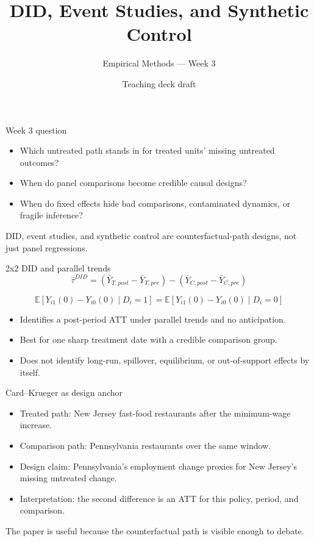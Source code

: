 \documentclass[aspectratio=169,11pt]{beamer}
\title{DID, Event Studies, and Synthetic Control}
\subtitle{Empirical Methods --- Week 3}
\author{Teaching deck draft}
\date{}
\newcommand{\E}{\mathbb{E}}
\newcommand{\1}{\mathbf{1}}
\begin{document}
\begin{frame}
  \titlepage
\end{frame}

\begin{frame}{Week 3 question}
\begin{itemize}
    \item Which untreated path stands in for treated units' missing untreated outcomes?
    \item When do panel comparisons become credible causal designs?
    \item When do fixed effects hide bad comparisons, contaminated dynamics, or fragile inference?
\end{itemize}

\medskip
DID, event studies, and synthetic control are counterfactual-path designs, not just panel regressions.
\end{frame}

\begin{frame}{2x2 DID and parallel trends}
\[
\widehat{\tau}^{DID}
=
\left(\bar{Y}_{T,post}-\bar{Y}_{T,pre}\right)
-
\left(\bar{Y}_{C,post}-\bar{Y}_{C,pre}\right)
\]

\[
\E[Y_{i1}(0)-Y_{i0}(0)\mid D_i=1]
=
\E[Y_{i1}(0)-Y_{i0}(0)\mid D_i=0]
\]

\begin{itemize}
    \item Identifies a post-period ATT under parallel trends and no anticipation.
    \item Best for one sharp treatment date with a credible comparison group.
    \item Does not identify long-run, spillover, equilibrium, or out-of-support effects by itself.
\end{itemize}
\end{frame}

\begin{frame}{Card--Krueger as design anchor}
\begin{itemize}
    \item Treated path: New Jersey fast-food restaurants after the minimum-wage increase.
    \item Comparison path: Pennsylvania restaurants over the same window.
    \item Design claim: Pennsylvania's employment change proxies for New Jersey's missing untreated change.
    \item Interpretation: the second difference is an ATT for this policy, period, and comparison.
\end{itemize}

\medskip
The paper is useful because the counterfactual path is visible enough to debate.
\end{frame}
\end{document}
